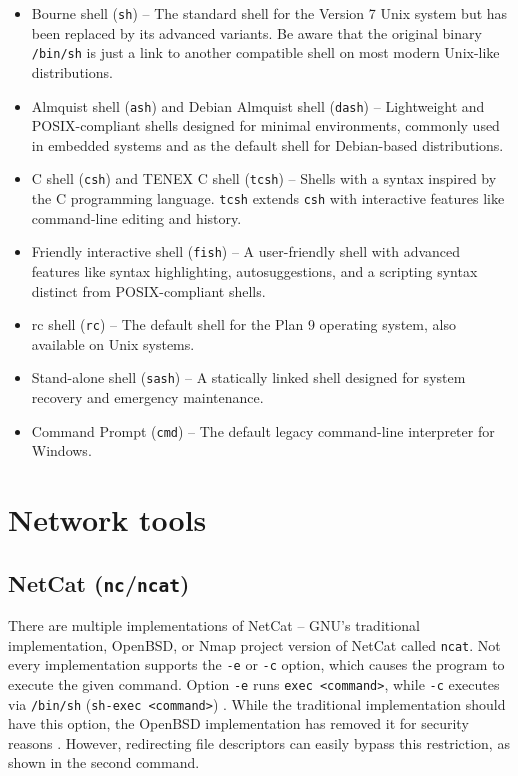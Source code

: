 \begin{itemize}
\item Bourne shell (\texttt{sh}) -- The standard shell for the Version 7 Unix system but has been replaced by its advanced variants. Be aware that the original binary \texttt{/bin/sh} is just a link to another compatible shell on most modern Unix-like distributions.
\item Almquist shell (\texttt{ash}) and Debian Almquist shell (\texttt{dash}) -- Lightweight and POSIX-compliant shells designed for minimal environments, commonly used in embedded systems and as the default shell for Debian-based distributions.
\item C shell (\texttt{csh}) and TENEX C shell (\texttt{tcsh}) -- Shells with a syntax inspired by the C programming language. \texttt{tcsh} extends \texttt{csh} with interactive features like command-line editing and history.
\item Friendly interactive shell (\texttt{fish}) -- A user-friendly shell with advanced features like syntax highlighting, autosuggestions, and a scripting syntax distinct from POSIX-compliant shells.
\item rc shell (\texttt{rc}) -- The default shell for the Plan 9 operating system, also available on Unix systems.
\item Stand-alone shell (\texttt{sash}) -- A statically linked shell designed for system recovery and emergency maintenance.
\item Command Prompt (\texttt{cmd}) -- The default legacy command-line interpreter for Windows.
\end{itemize}


\section{Network tools}

\subsection{NetCat (\texttt{nc}/\texttt{ncat})}

There are multiple implementations of NetCat -- GNU's traditional implementation, OpenBSD, or Nmap project version of NetCat called \texttt{ncat}. Not every implementation supports the \texttt{-e} or \texttt{-c} option, which causes the program to execute the given command. Option \texttt{-e} runs \texttt{exec <command>}, while \texttt{-c} executes via \texttt{/bin/sh} (\texttt{sh-exec <command>}) \cite{ncat-man}. While the traditional implementation should have this option, the OpenBSD implementation has removed it for security reasons \cite{nc-man}. However, redirecting file descriptors can easily bypass this restriction, as shown in the second command.

